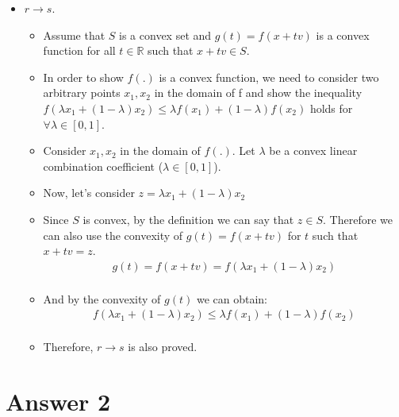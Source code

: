 \documentclass[12pt]{article}
\begin{document}
\begin{itemize}
            \item $r \rightarrow s$.
            \begin{itemize}
                \item Assume that $S$ is a convex set and $g(t) = f(x + tv)$ is a convex function for all $t \in \mathbb{R}$ such that $x + tv \in S$. 
                \item In order to show $f(.)$ is a convex function, we need to consider two arbitrary points $x_1,x_2$ in the domain of f and show the inequality $f(\lambda x_1 + (1-\lambda)x_2) \leq \lambda f(x_1) + (1-\lambda)f(x_2)$ holds for $\forall \lambda \in [0,1]$.
                \item Consider $x_1, x_2$ in the domain of $f(.)$. Let $\lambda$ be a convex linear combination coefficient ($\lambda \in [0,1]$).
                \item Now, let's consider $z = \lambda x_1 + (1-\lambda)x_2$
                \item Since $S$ is convex, by the definition we can say that $z \in S$. Therefore we can also use the convexity of $g(t) = f(x + tv)$ for $t$ such that $x+tv=z$.
                \begin{equation*}
                    \begin{split}
                        g(t) = f(x+tv) = f(\lambda x_1 + (1-\lambda)x_2)\\
                    \end{split}
                \end{equation*}
                \item And by the convexity of $g(t)$ we can obtain:
                \begin{equation*}
                    \begin{split}
                        f(\lambda x_1 + (1-\lambda)x_2) \leq \lambda f(x_1) + (1-\lambda)f(x_2)\\
                    \end{split}
                \end{equation*}
                \item Therefore, $r \rightarrow s$ is also proved.
            \end{itemize}
\end{itemize}{}

\section*{Answer 2}
\end{document}
